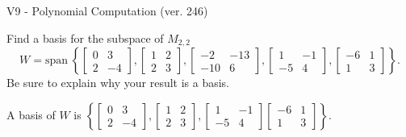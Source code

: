 \begin{exercise}
  \begin{exerciseTitle}V9 - Polynomial Computation (ver. 246)\end{exerciseTitle}
  \begin{exerciseStatement}
    Find a basis for the subspace of \(M_{2,2}\) 
\[W=\mathrm{span}\ \left\{\left[\begin{array}{cc}
0 & 3 \\
2 & -4
\end{array}\right] , \left[\begin{array}{cc}
1 & 2 \\
2 & 3
\end{array}\right] , \left[\begin{array}{cc}
-2 & -13 \\
-10 & 6
\end{array}\right] , \left[\begin{array}{cc}
1 & -1 \\
-5 & 4
\end{array}\right] , \left[\begin{array}{cc}
-6 & 1 \\
1 & 3
\end{array}\right]\right\}.\]
 Be sure to explain why your result is a basis.


  \end{exerciseStatement}
  \begin{exerciseAnswer}
   A basis of \(W\) is  \(\left\{\left[\begin{array}{cc}
0 & 3 \\
2 & -4
\end{array}\right] , \left[\begin{array}{cc}
1 & 2 \\
2 & 3
\end{array}\right] , \left[\begin{array}{cc}
1 & -1 \\
-5 & 4
\end{array}\right] \left[\begin{array}{cc}
-6 & 1 \\
1 & 3
\end{array}\right]\right\}\).
  


  \end{exerciseAnswer}
\end{exercise}